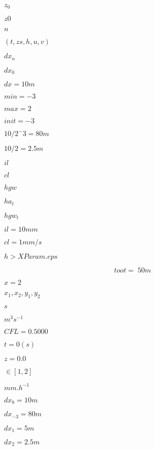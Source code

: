 \documentclass{article}
\begin{document}
$z_0$
\pagebreak

$z0$
\pagebreak

$n$
\pagebreak

$(t, zs, h, u,v)$
\pagebreak

$dx_n$
\pagebreak

$dx_0$
\pagebreak

$ dx=10m$
\pagebreak

$min=-3$
\pagebreak

$max=2$
\pagebreak

$init=-3$
\pagebreak

$10/2^-3=80m$
\pagebreak

$10/2=2.5m$
\pagebreak

$il$
\pagebreak

$cl$
\pagebreak

$hgw$
\pagebreak

$ha_{t}$
\pagebreak

$hgw_{t}$
\pagebreak

$il = 10 mm$
\pagebreak

$cl = 1 mm/s$
\pagebreak

$h > XParam.eps$
\pagebreak

\[ toot=\; 50m \]
\pagebreak

$ x=2 $
\pagebreak

$ x_1, x_2, y_1, y_2 $
\pagebreak

$s$
\pagebreak

$m^3s^{-1}$
\pagebreak

$ CFL=0.5000 $
\pagebreak

$ t=0 (s)$
\pagebreak

$z=0.0$
\pagebreak

$\in [1,2]$
\pagebreak

$ mm.h^{-1} $
\pagebreak

$ dx_8=10m$
\pagebreak

$dx_{-3}=80m$
\pagebreak

$dx_1=5m$
\pagebreak

$dx_2=2.5m$
\pagebreak
\end{document}
